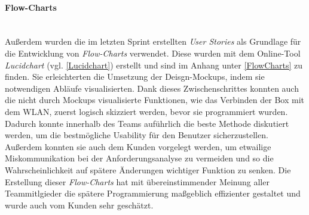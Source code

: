 \documentclass[10pt, a4paper]{article}
\begin{document}
\paragraph*{Flow-Charts} $~$ \\
Außerdem wurden die im letzten Sprint erstellten \textit{User Stories} als Grundlage für die Entwicklung von \textit{Flow-Charts} verwendet.
Diese wurden mit dem Online-Tool \textit{Lucidchart} (vgl. \ref*{Lucidchart}) erstellt und sind im Anhang unter \ref*{FlowCharts} zu finden.
Sie erleichterten die Umsetzung der Deisgn-Mockups, indem sie notwendigen Abläufe visualisierten.
Dank dieses Zwischenschrittes konnten auch die nicht durch Mockups visualisierte Funktionen, wie das Verbinden der Box mit dem WLAN, zuerst logisch skizziert
werden, bevor sie programmiert wurden. Dadurch konnte innerhalb des Teams auführlich die beste Methode diskutiert werden, um die bestmögliche Usability
für den Benutzer sicherzustellen. Außerdem konnten sie auch dem Kunden vorgelegt werden, um etwailige Miskommunikation bei der Anforderungsanalyse zu vermeiden
und so die Wahrscheinlichkeit auf spätere Änderungen wichtiger Funktion zu senken. Die Erstellung dieser \textit{Flow-Charts} hat mit übereinstimmender
Meinung aller Teammitlgieder die spätere Programmierung maßgeblich effizienter gestaltet und wurde auch vom Kunden sehr geschätzt.
\end{document}
